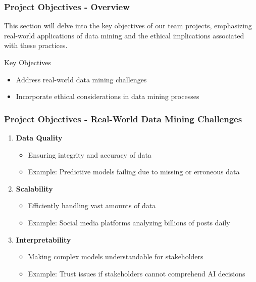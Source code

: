 \documentclass[aspectratio=169]{beamer}
\begin{document}
\begin{frame}[fragile]
    \frametitle{Project Objectives - Overview}
    This section will delve into the key objectives of our team projects, emphasizing real-world applications of data mining and the ethical implications associated with these practices.

    \begin{block}{Key Objectives}
        \begin{itemize}
            \item Address real-world data mining challenges
            \item Incorporate ethical considerations in data mining processes
        \end{itemize}
    \end{block}
\end{frame}

\begin{frame}[fragile]
    \frametitle{Project Objectives - Real-World Data Mining Challenges}
    \begin{enumerate}
        \item \textbf{Data Quality}
            \begin{itemize}
                \item Ensuring integrity and accuracy of data
                \item Example: Predictive models failing due to missing or erroneous data
            \end{itemize}

        \item \textbf{Scalability}
            \begin{itemize}
                \item Efficiently handling vast amounts of data
                \item Example: Social media platforms analyzing billions of posts daily
            \end{itemize}

        \item \textbf{Interpretability}
            \begin{itemize}
                \item Making complex models understandable for stakeholders
                \item Example: Trust issues if stakeholders cannot comprehend AI decisions
            \end{itemize}
    \end{enumerate}
\end{frame}
\end{document}
